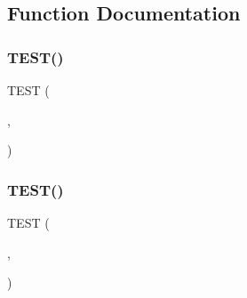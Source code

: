 \subsection{Function Documentation}
\mbox{\label{googletest-master_2googlemock_2test_2gmock__link__test_8h_a2a241b93f4367065a763c7df5133e5b6}} 
\subsubsection{\texorpdfstring{TEST()}{TEST()}\hspace{0.1cm}{\footnotesize\ttfamily [1/47]}}
{\footnotesize\ttfamily T\+E\+ST (\begin{DoxyParamCaption}\item[{\mbox{\hyperlink{_obj__test_2lib_2googletest-release-1_88_81_2googlemock_2test_2gmock__link__test_8cc_afb3d3e7fd53242710a55460595d750bb}{Link\+Test}}}]{,  }\item[{Test\+Return\+Void}]{ }\end{DoxyParamCaption})}

\mbox{\label{googletest-master_2googlemock_2test_2gmock__link__test_8h_a7fc9e5ba927fb0b787c401830d96e845}} 
\subsubsection{\texorpdfstring{TEST()}{TEST()}\hspace{0.1cm}{\footnotesize\ttfamily [2/47]}}
{\footnotesize\ttfamily T\+E\+ST (\begin{DoxyParamCaption}\item[{\mbox{\hyperlink{_obj__test_2lib_2googletest-release-1_88_81_2googlemock_2test_2gmock__link__test_8cc_afb3d3e7fd53242710a55460595d750bb}{Link\+Test}}}]{,  }\item[{Test\+Return}]{ }\end{DoxyParamCaption})}

\mbox{\label{googletest-master_2googlemock_2test_2gmock__link__test_8h_adac5a0d25e665298c61d73103f6b4ef6}} 
